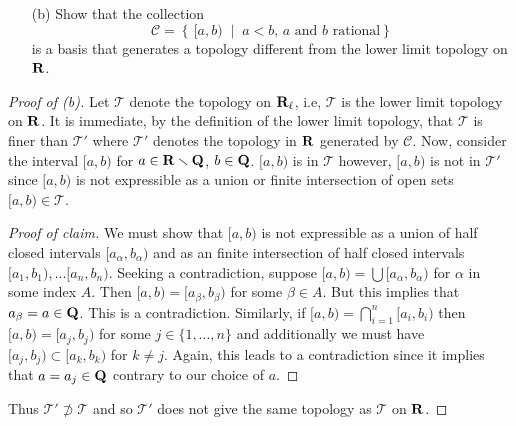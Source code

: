 \begin{problem}[Munkres, \S13, 8(b).]
\begin{enumerate}[noitemsep]
\item[(b)] Show that the collection
\[\mathcal{C}=\left\{\,[a,b)\;\middle|\;\text{$a<b$, $a$ and $b$ rational}\right\}\]
is a basis that generates a topology different from the lower
limit topology on $\mathbf{R}$.
\end{enumerate}
\end{problem}
\begin{proof}[Proof of (b)]
Let $\mathcal{T}$ denote the topology on $\mathbf{R}_\ell$, i.e,
$\mathcal{T}$ is the lower limit topology on $\mathbf{R}$. It is
immediate, by the definition of the lower limit topology, that
$\mathcal{T}$ is finer than $\mathcal{T}'$ where $\mathcal{T}'$
denotes the topology in $\mathbf{R}$ generated by $\mathcal{C}$. Now,
consider the interval $[a,b)$ for
$a\in\mathbf{R}\smallsetminus\mathbf{Q}$, $b\in\mathbf{Q}$. $[a,b)$ is in $\mathcal{T}$
however, $[a,b)$ is not in $\mathcal{T}'$ since $[a,b)$ is not
expressible as a union or finite intersection of open sets
$[a,b)\in\mathcal{T}$.
\begin{proof}[Proof of claim]
\renewcommand\qedsymbol{$\vardiamondsuit$}
We must show that $[a,b)$ is not expressible as a union of half
closed intervals $[a_\alpha,b_\alpha)$ and as an finite
intersection of  half closed intervals
$[a_1,b_1),...[a_n,b_n)$. Seeking a contradiction, suppose
$[a,b)=\bigcup [a_\alpha,b_\alpha)$ for $\alpha$ in some
index $A$. Then $[a,b)=[a_\beta,b_\beta)$ for some $\beta\in
A$. But this implies that $a_\beta=a\in\mathbf{Q}$. This is a
contradiction. Similarly, if $[a,b)=\bigcap_{i=1}^n[a_i,b_i)$
then $[a,b)=[a_j,b_j)$ for some $j\in\{1,...,n\}$ and
additionally we must have
$[a_j,b_j)\subset [a_k,b_k)$ for $k\neq j$. Again, this leads to
a contradiction since it implies that $a=a_j\in\mathbf{Q}$ contrary to
our choice of $a$.
\end{proof}
Thus $\mathcal{T}'\nsupset\mathcal{T}$ and so $\mathcal{T}'$ does
not give the same topology as $\mathcal{T}$ on $\mathbf{R}$.
\end{proof}
\newpage

